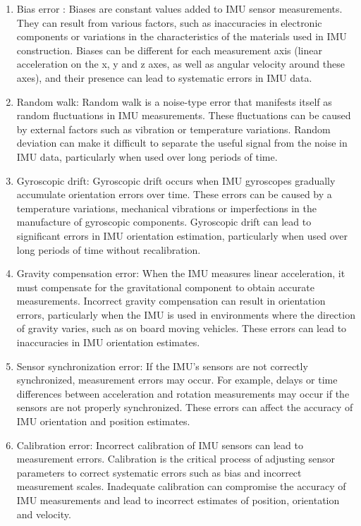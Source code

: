 \begin{enumerate}
	
	\item Bias error : Biases are constant values added to IMU sensor measurements. They can result from various factors, such as inaccuracies in electronic components or variations in the characteristics of the materials used in IMU construction. Biases can be different for each measurement axis (linear acceleration on the x, y and z axes, as well as angular velocity around these axes), and their presence can lead to systematic errors in IMU data. \cite{hexagon_imu:2025}
	
	\item Random walk: Random walk is a noise-type error that manifests itself as random fluctuations in IMU measurements. These fluctuations can be caused by external factors such as vibration or temperature variations. Random deviation can make it difficult to separate the useful signal from the noise in IMU data, particularly when used over long periods of time. \cite{vectornav_random_walk:2025}
	
	\item Gyroscopic drift: Gyroscopic drift occurs when IMU gyroscopes gradually accumulate orientation errors over time. These errors can be caused by  a temperature variations, mechanical vibrations or imperfections in the manufacture of gyroscopic components. Gyroscopic drift can lead to significant errors in IMU orientation estimation, particularly when used over long periods of time without recalibration. \cite{electronics_gyro_drift:2025}
	
	\item Gravity compensation error: When the IMU measures linear acceleration, it must compensate for the gravitational component to obtain accurate measurements. Incorrect gravity compensation can result in orientation errors, particularly when the IMU is used in environments where the direction of gravity varies, such as on board moving vehicles. These errors can lead to inaccuracies in IMU orientation estimates. \cite{advanced_nav_gravity:2025}
	
	\item Sensor synchronization error: If the IMU's sensors are not correctly synchronized, measurement errors may occur. For example, delays or time differences between acceleration and rotation measurements may occur if the sensors are not properly synchronized. These errors can affect the accuracy of IMU orientation and position estimates. \cite{advanced_nav_gravity:2025}
	
	\item Calibration error: Incorrect calibration of IMU sensors can lead to measurement errors. Calibration is the critical process of adjusting sensor parameters to correct systematic errors such as bias and incorrect measurement scales. Inadequate calibration can compromise the accuracy of IMU measurements and lead to incorrect estimates of position, orientation and velocity. \cite{researchgate_calibration:2025}
	
\end{enumerate}

